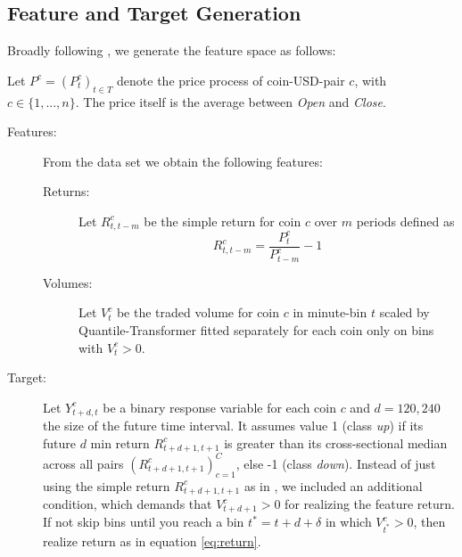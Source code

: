 \subsection{Feature and Target Generation} \label{ch:feature_and_target}
Broadly following \cite{takeuchi2013momentumTrading},
we generate the feature space as follows:

Let $ P^{c} = ( P^{c}_{t} )_{t \in T} $ denote the price process of coin-USD-pair $ c $, with $ c \in \{1, ... , n\} $. The price itself is the average between \textit{Open} and \textit{Close}.

\begin{description}
    \item[Features:] From the data set we obtain the following features:
    \begin{description}
        \item[Returns:] Let $ R^{c}_{t, t - m} $ be the simple return for coin $ c $ over $ m $ periods defined as
        \begin{equation}
            \label{eq:return}
            R^{c}_{t, t - m} = \frac{ P^{c}_{t} }{ P^{c}_{t - m} } - 1 
        \end{equation} 
        \item[Volumes:] {
            Let $ V^{c}_{t} $ be the traded volume for coin $ c $ in minute-bin $ t $ scaled by Quantile-Transformer 
            fitted separately for each coin only on bins with $ V^{c}_{t} > 0 $. 
        }
    \end{description}
    \item[Target:] {
        Let $ Y^{c}_{t + d, t} $ be a binary response variable for each coin $c$ 
        and $ d = 120, 240 $ the size of the future time interval. 
        It assumes value 1 (class \textit{up}) if its future $d$ min return $ R^{c}_{t + d + 1, t + 1} $ is greater 
        than its cross-sectional median across all pairs $ ( R^{c}_{t + d + 1, t + 1} )^{C}_{c=1} $, 
        else -1 (class \textit{down}). 
        Instead of just using the simple return $ R^{c}_{t + d + 1, t + 1} $ as in \cite{krauss2019statisticalArbitrage},
        we included an additional condition, which demands that $  V^{c}_{t + d + 1} > 0 $ for realizing the feature return.
        If not skip bins until you reach a bin $ t^{*} = t + d + \delta $  in which $  V^{c}_{ t^{*} } > 0 $, 
        then realize return as in equation \ref{eq:return}.
    }
\end{description}


